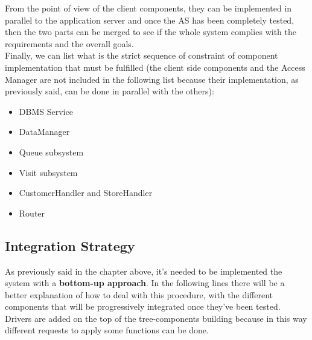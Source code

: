 \documentclass[]{article}
\begin{document}
From the point of view of the client components, they can be implemented in parallel to the application server and once the AS has been completely tested, then the two parts can be merged to see if the whole system complies with the requirements and the overall goals.\\ \newline
Finally, we can list what is the strict sequence of constraint of component implementation that must be fulfilled (the client side components and the Access Manager are not included in the following list because their implementation, as previously said, can be done in parallel with the others): 
				\begin{itemize}
					\item DBMS Service
					\item DataManager
					\item Queue subsystem
					\item Visit subsystem
					\item CustomerHandler and StoreHandler
					\item Router
				\end{itemize} 
				\textbf{} \newpage	
				
				
				\subsection{Integration Strategy}
				\medskip
As previously said in the chapter above, it’s needed to be implemented the system with a \textbf{bottom-up approach}. In the following lines there will be a better explanation of how to deal with this procedure, with the different components that will be progressively integrated once they’ve been tested. Drivers are added on the top of the tree-components building because in this way different requests to apply some functions can be done.
\end{document}
